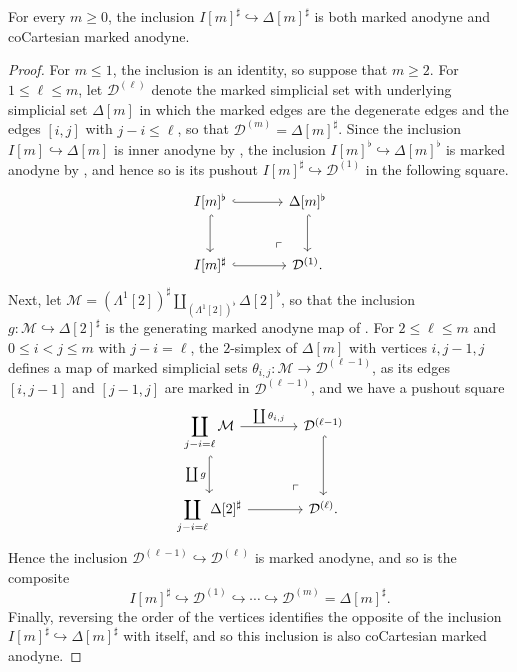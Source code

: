 \documentclass[10pt,reqno]{amsart}
\begin{document}
\begin{lemma}
\label{lem:marked-spine-anodyne}
For every $m\geq0$, the inclusion
$I[m]^\sharp\hookrightarrow\Delta[m]^\sharp$ is both marked
anodyne and coCartesian marked anodyne.
\end{lemma}

\begin{proof}
For $m\leq1$, the inclusion is an identity, so suppose that
$m\geq2$. For $1\leq\ell\leq m$, let $\mathcal D^{(\ell)}$ denote
the marked simplicial set with underlying simplicial set $\Delta[m]$
in which the marked edges are the degenerate edges and the edges
$[i,j]$ with $j-i\leq\ell$, so that
$\mathcal D^{(m)}=\Delta[m]^\sharp$. Since the inclusion
$I[m]\hookrightarrow\Delta[m]$ is inner anodyne by
\cite[Proposition~2.13]{Joyal2008Theory}, the inclusion
$I[m]^\flat\hookrightarrow\Delta[m]^\flat$ is marked anodyne by
\cite[Remark~3.1.1.4]{lurie2009higher}, and hence so is its pushout
$I[m]^\sharp\hookrightarrow\mathcal D^{(1)}$ in the following
square.
\[
\begin{tikzcd}[ampersand replacement=\&, sep=large]
I[m]^\flat\arrow[r,hook]\arrow[d,hook]
\&\Delta[m]^\flat\arrow[d,hook]\\
I[m]^\sharp\arrow[r,hook]
\&\mathcal D^{(1)}\arrow[ul,phantom,"\ulcorner",very near start].
\end{tikzcd}
\]
Next, let
$\mathcal M=(\Lambda^1[2])^\sharp
  \amalg_{(\Lambda^1[2])^\flat}\Delta[2]^\flat$, so that the inclusion
$g:\mathcal M\hookrightarrow\Delta[2]^\sharp$ is the generating
marked anodyne map of
\cite[Definition~3.1.1.1\textup{(3)}]{lurie2009higher}. For
$2\leq\ell\leq m$ and $0\leq i<j\leq m$ with $j-i=\ell$, the
$2$-simplex of $\Delta[m]$ with vertices $i,j-1,j$ defines a map
of marked simplicial sets
$\theta_{i,j}:\mathcal M\to \mathcal D^{(\ell-1)}$, as its edges
$[i,j-1]$ and $[j-1,j]$ are marked in $\mathcal D^{(\ell-1)}$,
and we have a pushout square
\[
\begin{tikzcd}[ampersand replacement=\&, sep=large]
\displaystyle\coprod_{j-i=\ell}\mathcal M
  \arrow[r,"{\coprod\theta_{i,j}}"]
  \arrow[d,hook,"\coprod g"']
\&\mathcal D^{(\ell-1)}\arrow[d,hook]\\
\displaystyle\coprod_{j-i=\ell}\Delta[2]^\sharp\arrow[r]
\&\mathcal D^{(\ell)}\arrow[ul,phantom,"\ulcorner",very near start].
\end{tikzcd}
\]
Hence the inclusion
$\mathcal D^{(\ell-1)}\hookrightarrow \mathcal D^{(\ell)}$ is marked
anodyne, and so is the composite
\[
I[m]^\sharp\hookrightarrow \mathcal D^{(1)}\hookrightarrow\cdots
\hookrightarrow \mathcal D^{(m)}=\Delta[m]^\sharp.
\]
Finally, reversing the order of the vertices identifies the opposite
of the inclusion $I[m]^\sharp\hookrightarrow\Delta[m]^\sharp$ with
itself, and so this inclusion is also coCartesian marked anodyne.
\end{proof}
\end{document}
